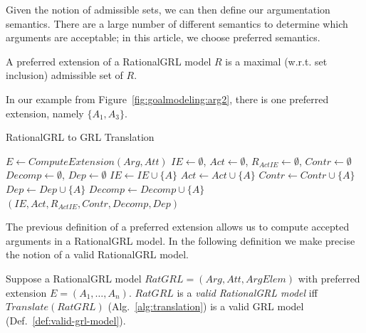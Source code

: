 Given the notion of admissible sets, we can then define our argumentation semantics. There are a large number of different semantics to determine which arguments are acceptable; in this article, we choose preferred semantics.


\begin{definition} \label{def:semantics}
A preferred extension of a RationalGRL model $R$ is a maximal (w.r.t. set inclusion) admissible set of $R$.
\end{definition}

In our example from Figure~\ref{fig:goalmodeling:arg2}, there is one preferred extension, namely $\{A_1,A_3\}$.


\begin{algorithm}[h]
  \caption{RationalGRL to GRL Translation}\label{alg:translation}
  \begin{algorithmic}[1]
    \State $E \leftarrow ComputeExtension(Arg,Att)$
    \State $IE\leftarrow\emptyset$, $Act\leftarrow\emptyset$, $R_{ActIE}\leftarrow\emptyset$, $Contr\leftarrow\emptyset$
    \State $Decomp\leftarrow\emptyset$, $Dep\leftarrow\emptyset$
            \State $IE\leftarrow IE\cup \{A\}$
          \EndCase
            \State $Act\leftarrow Act \cup\{A\}$
          \EndCase
            \State $Contr\leftarrow Contr\cup \{A\}$
          \EndCase
            \State $Dep\leftarrow Dep\cup \{A\}$
          \EndCase
            \State $Decomp\leftarrow Decomp\cup\{A\}$
          \EndCase
      \EndSwitch
    \EndFor
    \State \Return $(IE,Act,R_{ActIE}, Contr, Decomp, Dep)$
    \EndProcedure
  \end{algorithmic}
\end{algorithm}

The previous definition of a preferred extension allows us to compute accepted arguments in a RationalGRL model. In the following definition we make precise the notion of a valid RationalGRL model.

\begin{definition}
Suppose a RationalGRL model $RatGRL = (Arg, Att, ArgElem)$ with preferred extension $E=(A_1,\ldots,A_n)$. $RatGRL$ is a \emph{valid RationalGRL model} iff $Translate(RatGRL)$ (Alg.~\ref{alg:translation}) is a valid GRL model (Def.~\ref{def:valid-grl-model}).
\end{definition}

